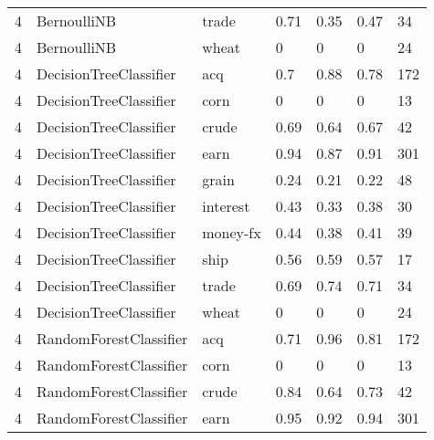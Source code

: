 \documentclass{article}
\begin{document}
\begin{table}[h]
\begin{tabular}{lllllll}
4             & BernoulliNB            & trade           & 0.71               & 0.35            & 0.47              & 34               \\
4             & BernoulliNB            & wheat           & 0                  & 0               & 0                 & 24               \\
4             & DecisionTreeClassifier & acq             & 0.7                & 0.88            & 0.78              & 172              \\
4             & DecisionTreeClassifier & corn            & 0                  & 0               & 0                 & 13               \\
4             & DecisionTreeClassifier & crude           & 0.69               & 0.64            & 0.67              & 42               \\
4             & DecisionTreeClassifier & earn            & 0.94               & 0.87            & 0.91              & 301              \\
4             & DecisionTreeClassifier & grain           & 0.24               & 0.21            & 0.22              & 48               \\
4             & DecisionTreeClassifier & interest        & 0.43               & 0.33            & 0.38              & 30               \\
4             & DecisionTreeClassifier & money-fx        & 0.44               & 0.38            & 0.41              & 39               \\
4             & DecisionTreeClassifier & ship            & 0.56               & 0.59            & 0.57              & 17               \\
4             & DecisionTreeClassifier & trade           & 0.69               & 0.74            & 0.71              & 34               \\
4             & DecisionTreeClassifier & wheat           & 0                  & 0               & 0                 & 24               \\
4             & RandomForestClassifier & acq             & 0.71               & 0.96            & 0.81              & 172              \\
4             & RandomForestClassifier & corn            & 0                  & 0               & 0                 & 13               \\
4             & RandomForestClassifier & crude           & 0.84               & 0.64            & 0.73              & 42               \\
4             & RandomForestClassifier & earn            & 0.95               & 0.92            & 0.94              & 301              \\\end{tabular}
\end{table}
\end{document}
